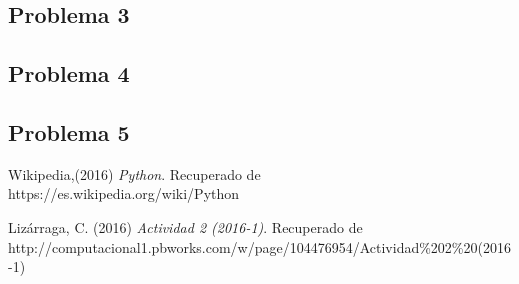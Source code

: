\documentclass[12pt]{article}
\begin{document}
\subsection{Problema 3}
\subsection{Problema 4}
\subsection{Problema 5}
\begin{thebibliography}{6}

	Wikipedia,(2016)
	\emph{Python}. Recuperado de\\ https://es.wikipedia.org/wiki/Python

	Lizárraga, C. (2016)
	\emph{Actividad 2 (2016-1)}. Recuperado de\\ http://computacional1.pbworks.com/w/page/104476954/Actividad\%202\%20(2016-1)
\end{thebibliography}
\end{document}
